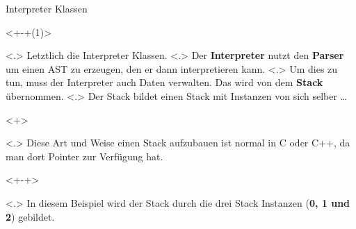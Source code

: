   \begin{frame}{Interpreter Klassen}
    \begin{uncoverenv}<+-+(1)>%
          \note[item]<.>{
            Letztlich die Interpreter Klassen.
          }
          \note[item]<.>{
            Der \textbf{Interpreter} nutzt den \textbf{Parser} um einen AST zu erzeugen, den er dann interpretieren kann.
          }
          \note[item]<.>{
            Um dies zu tun, muss der Interpreter auch Daten verwalten. Das wird von dem \textbf{Stack} übernommen.
          }
          \note[item]<.>{
            Der Stack bildet einen Stack mit Instanzen von sich selber \ldots
          }
      \begin{uncoverenv}<+>%
      \end{uncoverenv}%
          \note[item]<.>{
             Diese Art und Weise einen Stack aufzubauen ist normal in C oder C++, da man dort Pointer zur Verfügung hat.
          }
    \end{uncoverenv}
    \begin{uncoverenv}<+-+>%
          \note[item]<.>{
            In diesem Beispiel wird der Stack durch die drei Stack Instanzen (\textbf{0, 1 und 2}) gebildet.
          }

\end{uncoverenv}
\end{frame}
